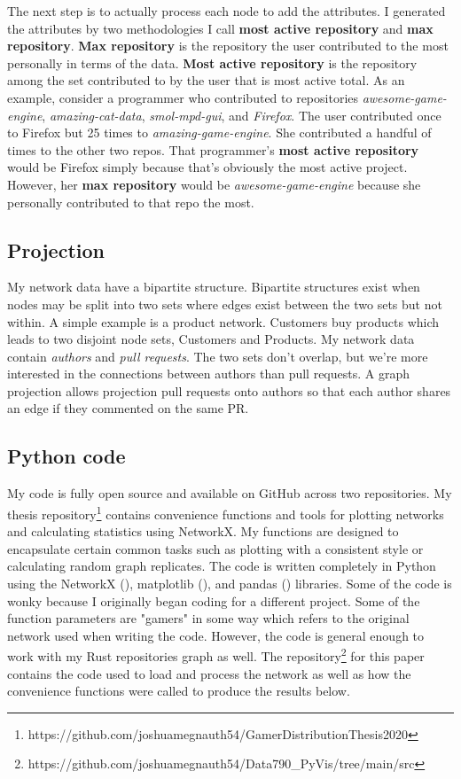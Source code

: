 \documentclass[12pt, a4paper]{article}
\begin{document}
The next step is to actually process each node to add the attributes. I generated the attributes by two methodologies I call \textbf{most active repository} and \textbf{max repository}. \textbf{Max repository} is the repository the user contributed to the most personally in terms of the data. \textbf{Most active repository} is the repository among the set contributed to by the user that is most active total. As an example, consider a programmer who contributed to repositories \textit{awesome-game-engine}, \textit{amazing-cat-data}, \textit{smol-mpd-gui}, and \textit{Firefox}. The user contributed once to Firefox but 25 times to \textit{amazing-game-engine}. She contributed a handful of times to the other two repos. That programmer's \textbf{most active repository} would be Firefox simply because that's obviously the most active project. However, her \textbf{max repository} would be \textit{awesome-game-engine} because she personally contributed to that repo the most.

\subsection{Projection}
My network data have a bipartite structure. Bipartite structures exist when nodes may be split into two sets where edges exist between the two sets but not within. A simple example is a product network. Customers buy products which leads to two disjoint node sets, Customers and Products. My network data contain \textit{authors} and \textit{pull requests}. The two sets don't overlap, but we're more interested in the connections between authors than pull requests. A graph projection allows projection pull requests onto authors so that each author shares an edge if they commented on the same PR.

\subsection{Python code}
My code is fully open source and available on GitHub across two repositories. My thesis repository\footnote{https://github.com/joshuamegnauth54/GamerDistributionThesis2020} contains convenience functions and tools for plotting networks and calculating statistics using NetworkX. My functions are designed to encapsulate certain common tasks such as plotting with a consistent style or calculating random graph replicates. The code is written completely in Python using the NetworkX (\cite{networkx}), matplotlib (\cite{Hunter:2007}), and pandas (\cite{reback2020pandas}) libraries. Some of the code is wonky because I originally began coding for a different project. Some of the function parameters are "gamers" in some way which refers to the original network used when writing the code. However, the code is general enough to work with my Rust repositories graph as well. The repository\footnote{https://github.com/joshuamegnauth54/Data790\_PyVis/tree/main/src} for this paper contains the code used to load and process the network as well as how the convenience functions were called to produce the results below.
\end{document}
